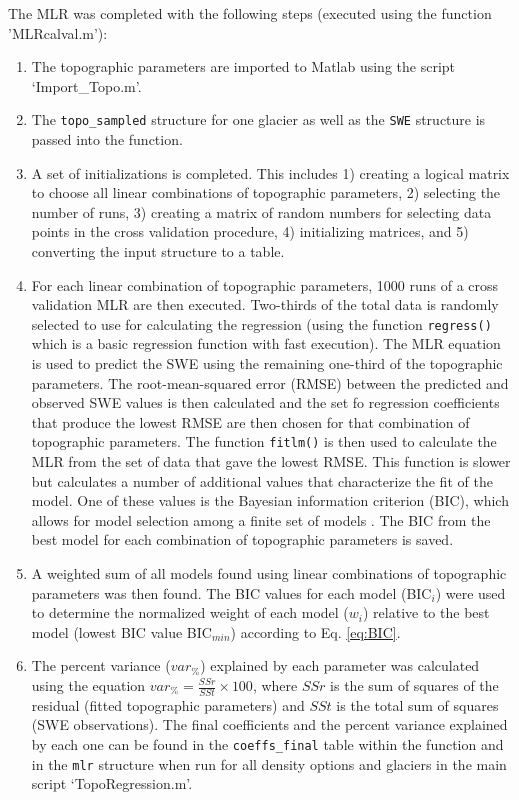 \documentclass[12pt]{article}
\begin{document}
The MLR was completed with the following steps (executed using the function 'MLRcalval.m'):
\begin{enumerate}
\item The topographic parameters are imported to Matlab using the script `Import\_Topo.m'.

\item The \texttt{topo\_sampled} structure for one glacier as well as the \texttt{SWE} structure is passed into the function.

\item A set of initializations is completed. This includes 1) creating a logical matrix to choose all linear combinations of topographic parameters, 2) selecting the number of runs, 3) creating a matrix of random numbers for selecting data points in the cross validation procedure, 4) initializing matrices, and 5) converting the input structure to a table.

\item For each linear combination of topographic parameters, 1000 runs of a cross validation MLR are then executed. Two-thirds of the total data is randomly selected \citep{Kohavi1995} to use for calculating the regression (using the function \texttt{regress()} which is a basic regression function with fast execution). The MLR equation is used to predict the SWE using the remaining one-third of the topographic parameters. The root-mean-squared error (RMSE) between the predicted and observed SWE values is then calculated and the set fo regression coefficients that produce the lowest RMSE are then chosen for that combination of topographic parameters. The function \texttt{fitlm()} is then used to calculate the MLR from the set of data that gave the lowest RMSE. This function is slower but calculates a number of additional values that characterize the fit of the model. One of these values is the Bayesian information criterion (BIC), which allows for model selection among a finite set of models \citep{Burnham2004}. The BIC from the best model for each combination of topographic parameters is saved.

\item A weighted sum of all models found using linear combinations of topographic parameters was then found. The BIC values for each model (BIC$_i$) were used to determine the normalized weight of each model ($w_i$) relative to the best model (lowest BIC value BIC$_{min}$) according to Eq. \ref{eq:BIC}.

\item The percent variance ($var_\%$) explained by each parameter was calculated using the equation $var_\% = \frac{SSr}{SSt}\times 100$, where $SSr$ is the sum of squares of the residual (fitted topographic parameters) and $SSt$ is the total sum of squares (SWE observations). The final coefficients and the percent variance explained by each one can be found in the \texttt{coeffs\_final} table within the function and in the \texttt{mlr} structure when run for all density options and glaciers in the main script `TopoRegression.m'.


\end{enumerate}
\end{document}
